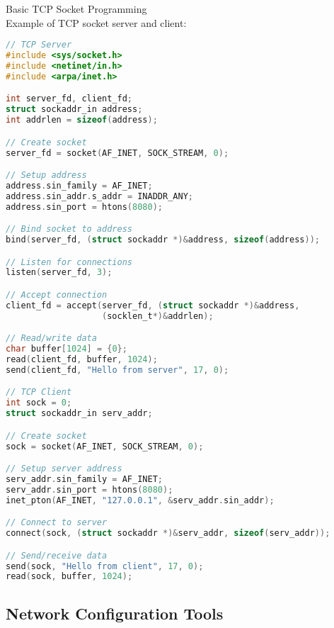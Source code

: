 \begin{code}{Basic TCP Socket Programming}\\
    Example of TCP socket server and client:
    
\begin{lstlisting}[language=C, style=basesmol]
// TCP Server
#include <sys/socket.h>
#include <netinet/in.h>
#include <arpa/inet.h>

int server_fd, client_fd;
struct sockaddr_in address;
int addrlen = sizeof(address);

// Create socket
server_fd = socket(AF_INET, SOCK_STREAM, 0);

// Setup address
address.sin_family = AF_INET;
address.sin_addr.s_addr = INADDR_ANY;
address.sin_port = htons(8080);

// Bind socket to address
bind(server_fd, (struct sockaddr *)&address, sizeof(address));

// Listen for connections
listen(server_fd, 3);

// Accept connection
client_fd = accept(server_fd, (struct sockaddr *)&address, 
                   (socklen_t*)&addrlen);

// Read/write data
char buffer[1024] = {0};
read(client_fd, buffer, 1024);
send(client_fd, "Hello from server", 17, 0);

// TCP Client
int sock = 0;
struct sockaddr_in serv_addr;

// Create socket
sock = socket(AF_INET, SOCK_STREAM, 0);

// Setup server address
serv_addr.sin_family = AF_INET;
serv_addr.sin_port = htons(8080);
inet_pton(AF_INET, "127.0.0.1", &serv_addr.sin_addr);

// Connect to server
connect(sock, (struct sockaddr *)&serv_addr, sizeof(serv_addr));

// Send/receive data
send(sock, "Hello from client", 17, 0);
read(sock, buffer, 1024);
\end{lstlisting}
\end{code}

\subsection{Network Configuration Tools}

